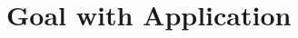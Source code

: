 \documentclass[a4paper,12pt]{article}
\begin{document}
\section{Goal with Application}
\end{document}
